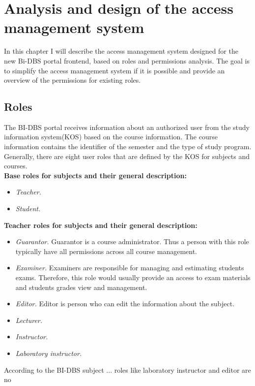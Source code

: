 \chapter{Analysis and design of the access management system} In this chapter I will describe the access management system designed for the new Bi-DBS portal frontend, based on roles and permissions analysis. The goal is to simplify the access management system if it is possible and provide an overview of the permissions for existing roles.


\section{Roles} The BI-DBS portal receives information about an authorized user from the study information system(KOS) based on the course information. The course information contains the identifier of the semester and the type of study program. Generally, there are eight user roles that are defined by the KOS for subjects and courses.\\

\noindent \textbf{Base roles for subjects and their general description:}

\begin{itemize}
    \item \emph{Teacher.} 
    \item \emph{Student.} 
\end{itemize}

\noindent \textbf{Teacher roles for subjects and their general description:}

\begin{itemize}
    \item \emph{Guarantor.} Guarantor is a course administrator. Thus a person with this role typically have all permissions across all course management.
    \item \emph{Examiner.} Examiners are responsible for managing and estimating students exams. Therefore, this role would usually provide an access to exam materials and students grades view and management.
    \item \emph{Editor.} Editor is person who can edit the information about the subject.
    \item \emph{Lecturer.} 
    \item \emph{Instructor.} 
    \item \emph{Laboratory instructor.}
\end{itemize}

According to the BI-DBS subject ... roles like laboratory instructor and editor are no

